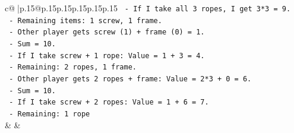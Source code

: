 \documentclass{article}
\begin{document}
{\begin{supertabular}{c@{$\;$}|p{.15\linewidth}@{}p{.15\linewidth}p{.15\linewidth}p{.15\linewidth}p{.15\linewidth}p{.15\linewidth}}
{{{\texttt{    {-} If I take all 3 ropes, I get 3*3 = 9.} \\
\texttt{    {-} Remaining items: 1 screw, 1 frame.} \\
\texttt{    {-} Other player gets screw (1) + frame (0) = 1.} \\
\texttt{    {-} Sum = 10.} \\
\texttt{    {-} If I take screw + 1 rope: Value = 1 + 3 = 4.} \\
\texttt{    {-} Remaining: 2 ropes, 1 frame.} \\
\texttt{    {-} Other player gets 2 ropes + frame: Value = 2*3 + 0 = 6.} \\
\texttt{    {-} Sum = 10.} \\
\texttt{    {-} If I take screw + 2 ropes: Value = 1 + 6 = 7.} \\
\texttt{    {-} Remaining: 1 rope} \\
            }
        }
    }
    & & \\ \\


\end{supertabular}}
\end{document}
